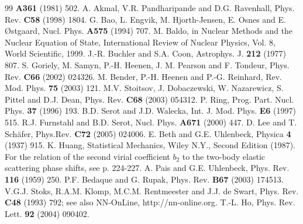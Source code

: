 \documentclass[aps,prc,twocolumn,showpacs,showkeys,amsmath,amssymb]{revtex4}
\begin{document}
\begin{thebibliography}{99}
\textbf{A361} (1981) 502.
 A. Akmal, V.R. Pandharipande and D.G. Ravenhall,
Phys. Rev. \textbf{C58} (1998) 1804.
 G. Bao, L. Engvik, M. Hjorth-Jensen, E. Osnes and
E. {\O}stgaard, Nucl. Phys. \textbf{A575} (1994) 707.
 M. Baldo, in Nuclear Methods and the Nuclear Equation 
of State, International Review of Nuclear Physics, Vol. 8, World 
Scientific, 1999.
 J.-R. Buchler and S.A. Coon, Astrophys. J. \textbf{212} (1977)
807.
 S. Goriely, M. Samyn, P.-H. Heenen, J. M. Pearson
and F. Tondeur, Phys. Rev. \textbf{C66} (2002) 024326.
 M. Bender, P.-H. Heenen and P.-G. Reinhard, Rev. 
Mod. Phys. \textbf{75} (2003) 121.
 M.V. Stoitsov, J. Dobaczewski, W. Nazarewicz, 
S. Pittel and D.J. Dean, Phys. Rev. \textbf{C68} (2003) 054312.
 P. Ring, Prog. Part. Nucl. Phys. \textbf{37} (1996) 193.
 B.D. Serot and J.D. Walecka, Int. J. Mod. Phys. 
\textbf{E6} (1997) 515.
 R.J. Furnstahl and B.D. Serot, Nucl. Phys. \textbf{A671} 
(2000) 447.
 D. Lee and T. Sch\"afer, Phys.Rev. \textbf{C72} (2005)
024006.
 E. Beth and G.E. Uhlenbeck, Physica \textbf{4} (1937) 915.
 K. Huang, Statistical Mechanics, Wiley N.Y., Second
Edition (1987). For the relation of the second virial coefficient $b_2$
to the two-body elastic scattering phase shifts, see p. 224-227.
 A. Pais and G.E. Uhlenbeck, Phys. Rev. 
\textbf{116} (1959) 250.
 P.F. Bedaque and G. Rupak, Phys. Rev. \textbf{B67}
(2003) 174513.
 V.G.J. Stoks, R.A.M. Klomp, M.C.M. Rentmeester and 
J.J. de Swart, Phys. Rev. \textbf{C48} (1993) 792; see also NN-OnLine,
http://nn-online.org.
 T.-L. Ho, Phys. Rev. Lett. \textbf{92} (2004) 090402.
\end{thebibliography}
\end{document}
